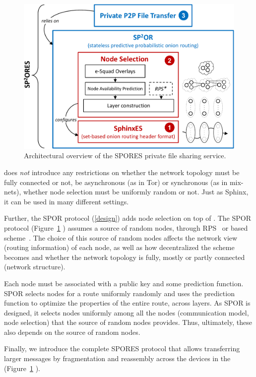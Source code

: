 \begin{figure}[t]
  \centering
  \def\svgwidth{0.8\columnwidth}
    \includegraphics[width=\columnwidth]{figures/OverviewSPORES_cropped}
    \caption{%
      Architectural overview of the \ac{SPORES} private file sharing service.
    }
    \label{fig:outline}
\end{figure}

\Sphinxes does \emph{not} introduce any restrictions on whether the network 
topology must be fully connected or not, be asynchronous (as in Tor) or 
synchronous (as in mix-nets), whether node selection must be uniformly random 
or not.
Just as \ac{Sphinx}, it can be used in many different settings.

Further, the \ac{SPOR} protocol (\cref{design}) adds node selection on top of \Sphinxes.
The \ac{SPOR} protocol (Figure~\ref{fig:outline} )  assumes a source of random nodes, \eg through 
\ac{RPS}~\cite[\eg][]{BrahmsRPS} or  based 
scheme~\cite[\eg][]{Octopus}.
The choice of this source of random nodes affects the network view (routing 
information) of each node, as well as how decentralized the scheme becomes and 
whether the network topology is fully, mostly or partly connected (network 
structure).

Each node must be associated with a public key and some prediction function.
\Ac{SPOR} selects nodes for a route uniformly randomly and uses the prediction 
function to optimize the properties of the entire route, \ie across layers.
As \ac{SPOR} is designed, it selects nodes uniformly among all the nodes 
(communication model, node selection) that the source of random nodes provides.
Thus, ultimately, these also depends on the source of random nodes.

Finally, we introduce the complete \ac{SPORES} protocol that allows 
transferring larger messages by fragmentation and reassembly across the devices 
in the \squad  (Figure~\ref{fig:outline} ).
